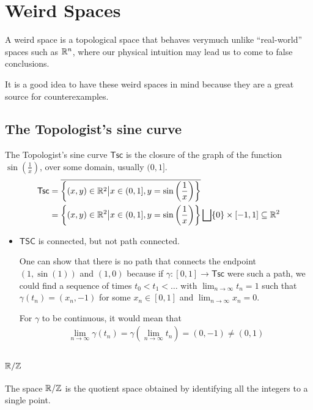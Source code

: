 \section{Weird Spaces}
A weird space is a topological space that behaves verymuch unlike ``real-world'' spaces such as $\mathbb{R}^{n}$, where our physical intuition may lead us to come to false conclusions.

It is a good idea to have these weird spaces in mind because they are a great source for counterexamples.


\subsection*{The Topologist's sine curve}

The Topologist's sine curve $\textsf{Tsc}$ is the closure of the graph of the function $\sin(\tfrac{1}{x})$, over some domain, usually $(0,1]$.
\begin{align*}
  \textsf{Tsc} 
  &= \overline{
    \left\{
      (x,y) \in \mathbb{R}^{2} \big\vert
      x \in (0,1], y = \sin\left(
        \frac{1}{x}
      \right)
    \right\}
  } 
  \\
  &=
    \left\{
      (x,y) \in \mathbb{R}^{2} \big\vert
      x \in (0,1], y = \sin\left(
        \frac{1}{x}
      \right)
    \right\}
    \bigsqcup
    \{0\} \times [-1,1]  \subseteq \mathbb{R}^{2}
\end{align*}
\begin{itemize}
  \item $\textsf{TSC}$ is connected, but not path connected.

    One can show that there is no path that connects the endpoint $(1,\sin(1))$ and $(1,0)$ because if $\gamma: [0,1] \to \textsf{Tsc}$ were such a path, we could find a sequence of times $t_0 < t_1 < \ldots$ with $\lim_{n \to \infty} t_n = 1$ such that $\gamma(t_n) = (x_n,-1)$ for some $x_n \in [0,1]$ and $\lim_{n \to \infty} x_n = 0$.

    For $\gamma$ to be continuous, it would mean that
    \begin{align*}
      \lim_{n \to \infty} \gamma(t_n) = \gamma( \lim_{n \to \infty} t_n) = (0,-1) \neq (0,1)
    \end{align*}
\end{itemize}


\subsection*{$\mathbb{R}/\mathbb{Z}$}

The space $\mathbb{R}/\mathbb{Z}$ is the quotient space obtained by identifying all the integers to a single point.

